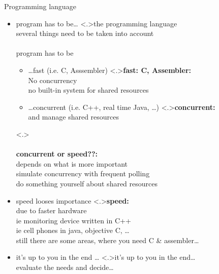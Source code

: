 \documentclass[ngerman={babel}, utf8, bigger, t, xcolor={table,dvipsnames}, ompress, hyperref={bookmarks,colorlinks},red]{beamer}
\begin{document}
\begin{frame}{Programming language}
	\begin{itemize}
		\item program has to be\dots
		\note<.>{}the programming language \\ several things need to be taken into account \\ \ \\ program has to be
			\begin{itemize}
				\item \dots fast (i.e. C, Asssembler)
				\note<.>{\textbf{fast: C, Assembler:}\\ No concurrency \\ no built-in system for shared resources}
				\item \dots concurrent (i.e. C++, real time Java, \dots){}
				\note<.>{\textbf{concurrent:}\\ and manage shared resources}
			\end{itemize}
			\note<.>{\\ \ \\ \textbf{concurrent or speed??:}\\ depends on what is more important \\ simulate concurrency with frequent polling \\ do something yourself about shared resources}
			\item speed looses importance
			\note<.>{\textbf{speed:}\\ due to faster hardware \\ ie monitoring device written in C++ \\ ie cell phones in java, objective C, \dots \\ still there are some areas, where you need C \& assembler\dots}
			\item it's up to you in the end \dots
			\note<.>{it's up to you in the end\dots \\ evaluate the needs and decide\dots}
	\end{itemize}
\end{frame}
\end{document}
